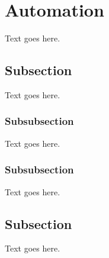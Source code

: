 
%
%

\section{Automation}
\label{sec:automation}



Text goes here.




\subsection{Subsection}
\label{subsec:automation--subsection1}


Text goes here.



\subsubsection{Subsubsection}
\label{subsubsec:automation--subsection1--subsubsection1}


Text goes here.



\subsubsection{Subsubsection}
\label{subsubsec:automation--subsection1--subsubsection2}


Text goes here.




\subsection{Subsection}
\label{subsec:automation--subsection2}


Text goes here.




